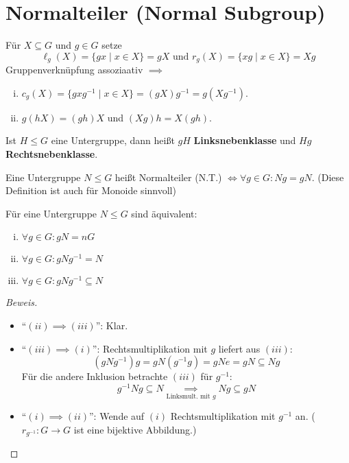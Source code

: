 \documentclass[a4paper]{report}
\begin{document}
\section*{Normalteiler (Normal Subgroup)}
\begin{nota*}
  Für $X \subseteq G$ und $g \in G$ setze $$\ell_{g}(X) = \{gx \mid x \in X\} = gX \text{ und } r_{g}(X) = \{xg \mid x \in X\} = Xg$$
  Gruppenverknüpfung assoziaativ $\implies$
  \begin{enumerate}[(i)]
    \item $c_{g}(X) = \{gxg^{-1} \mid x \in X\} = (gX)g^{-1} = g(Xg^{-1})$.
    \item $g(hX) = (gh)X$ und $(Xg)h = X(gh)$.
  \end{enumerate}
\end{nota*}

\begin{bem*} Ist $H \le G$ eine Untergruppe, dann heißt $gH$ \textbf{Linksnebenklasse} und $Hg$ \textbf{Rechtsnebenklasse}.
\end{bem*}

\begin{defi}
  Eine Untergruppe $N \le G$ heißt Normalteiler (N.T.) $\iff \forall g \in G : Ng = gN$. (Diese Definition ist auch für Monoide sinnvoll)
\end{defi}

\begin{lemm}
  Für eine Untergruppe $N \le G$ sind äquivalent:
  \begin{enumerate}[(i)]
    \item $\forall g \in G : gN = nG$
    \item $\forall g \in G : gNg^{-1} = N$
    \item $\forall g \in G : gNg^{-1} \subseteq N$
  \end{enumerate}
  \begin{proof}[Beweis]
\begin{itemize}
\item ``$(ii)\implies (iii)$'': Klar.
  \item ``$(iii)\implies (i)$'': Rechtsmultiplikation mit $g$ liefert aus $(iii)$:
        $$(gNg^{-1})g = gN(g^{-1}g) = gNe = gN \subseteq Ng$$
        Für die andere Inklusion betrachte $(iii)$ für $g^{-1}$:
        $$g^{-1}Ng \subseteq N \underset{\text{Linksmult. mit }g}\implies Ng \subseteq gN$$
\item ``$(i)\implies (ii)$'': Wende auf $(i)$ Rechtsmultiplikation mit $g^{-1}$ an. ($r_{g^{-1}}: G \to G$ ist eine bijektive Abbildung.)
\end{itemize}
  \end{proof}
\end{lemm}
\end{document}
